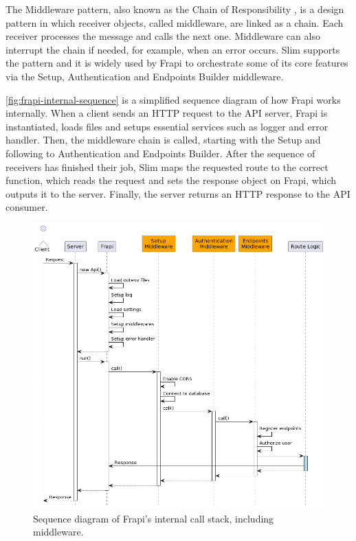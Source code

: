 The Middleware pattern, also known as the Chain of Responsibility \cite{chain-of-responsibility}, is a design pattern in which receiver objects, called middleware, are linked as a chain. Each receiver processes the message and calls the next one. Middleware can also interrupt the chain if needed, for example, when an error occurs. Slim supports the pattern \cite{slim-middleware-doc} and it is widely used by Frapi to orchestrate some of its core features via the Setup, Authentication and Endpoints Builder middleware.

\autoref{fig:frapi-internal-sequence} is a simplified sequence diagram of how Frapi works internally. When a client sends an HTTP request to the API server, Frapi is instantiated, loads files and setups essential services such as logger and error handler. Then, the middleware chain is called, starting with the Setup and following to Authentication and Endpoints Builder. After the sequence of receivers has finished their job, Slim maps the requested route to the correct function, which reads the request and sets the response object on Frapi, which outputs it to the server. Finally, the server returns an HTTP response to the API consumer.

\begin{figure}[htbp]
  \centering
  \includegraphics[scale=0.5]{Imagens/chap03/middleware-sequence-diagram.png}
  \caption{Sequence diagram of Frapi's internal call stack, including middleware.}
  \label{fig:frapi-internal-sequence}
\end{figure}